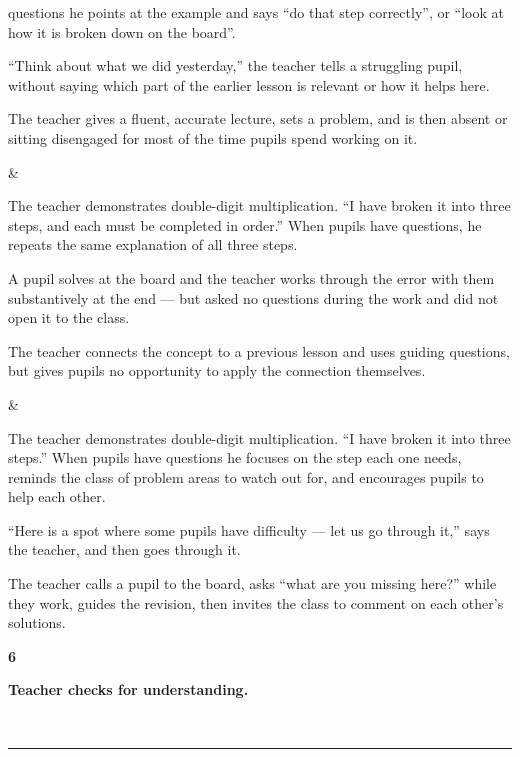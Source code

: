 \documentclass[10pt,a4paper]{article}
\newcommand{\exlistsize}{\scriptsize}
\newcommand{\conceptheader}[2]{%
  \noindent
  \begin{minipage}[c]{13mm}\raggedright
    {\fontsize{30}{30}\selectfont\bfseries\color{tnavy}#1}
  \end{minipage}%
  \begin{minipage}[c]{\dimexpr\linewidth-13mm\relax}\RaggedRight
    {\large\bfseries #2}
  \end{minipage}\\[1.5mm]
  \textcolor{tnavy}{\rule{\linewidth}{1.1pt}}\\[2mm]}
\begin{document}
{\begin{exlist}
        questions he points at the example and says ``do that step correctly'', or ``look at how it is
        broken down on the board''.
  \item ``Think about what we did yesterday,'' the teacher tells a struggling pupil, without saying which
        part of the earlier lesson is relevant or how it helps here.
  \item The teacher gives a fluent, accurate lecture, sets a problem, and is then absent or sitting
        disengaged for most of the time pupils spend working on it.
\end{exlist} &
\exlistsize\begin{exlist}
  \item The teacher demonstrates double-digit multiplication. ``I have broken it into three steps, and each
        must be completed in order.'' When pupils have questions, he repeats the same explanation of all
        three steps.
  \item A pupil solves at the board and the teacher works through the error with them substantively at the
        end --- but asked no questions during the work and did not open it to the class.
  \item The teacher connects the concept to a previous lesson and uses guiding questions, but gives pupils
        no opportunity to apply the connection themselves.
\end{exlist} &
\exlistsize\begin{exlist}
  \item The teacher demonstrates double-digit multiplication. ``I have broken it into three steps.'' When
        pupils have questions he focuses on the step each one needs, reminds the class of problem areas to
        watch out for, and encourages pupils to help each other.
  \item ``Here is a spot where some pupils have difficulty --- let us go through it,'' says the teacher, and
        then goes through it.
  \item The teacher calls a pupil to the board, asks ``what are you missing here?'' while they work, guides
        the revision, then invites the class to comment on each other's solutions.
\end{exlist}
}
 

\clearpage


\conceptheader{6}{Teacher checks for understanding.}
 
\end{document}
